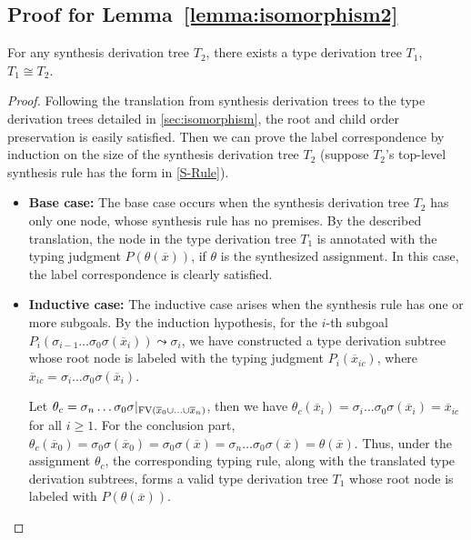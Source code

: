 \subsection{Proof for Lemma~\ref{lemma:isomorphism2}}
\label{sec:appendix-lemma4}

\begin{lemma}
For any synthesis derivation tree $T_2$, there exists a type derivation tree $T_1$, $T_1 \cong T_2$.
\end{lemma}
\begin{proof}
  Following the translation from synthesis derivation trees to the type derivation trees detailed in \autoref{sec:isomorphism}, the root and child order preservation is easily satisfied. Then we can prove the label correspondence by induction on the size of the synthesis derivation tree $T_2$ (suppose $T_2$'s top-level synthesis rule has the form in \autoref{S-Rule}).

  \begin{itemize}
     \item \textbf{Base case:} The base case occurs when the synthesis derivation tree $T_2$ has only one node, whose synthesis rule has no premises. By the described translation, the node in the type derivation tree $T_1$ is annotated with the typing judgment $P(\theta(\overline{x}))$, if $\theta$ is the synthesized assignment. In this case, the label correspondence is clearly satisfied.
     \item \textbf{Inductive case:} The inductive case arises when the synthesis rule has one or more subgoals. 
     By the induction hypothesis, for the $i$-th subgoal $P_i(\sigma_{i-1}\ldots\sigma_0\sigma(\overline{x}_i)) \leadsto \sigma_i$, we have constructed a type derivation subtree whose root node is labeled with the typing judgment $P_i(\overline{x}_{ic})$, where $\overline{x}_{ic}=\sigma_{i}\ldots\sigma_0\sigma(\overline{x}_i)$. 
     
     Let $\theta_c=\sigma_{n}\ldots\sigma_0\sigma|_{\text{FV}(\overline{x}_0\cup\ldots\cup\overline{x}_n)}$, then we have $\theta_c(\overline{x}_{i})=\sigma_{i}\ldots\sigma_0\sigma(\overline{x}_i)=\overline{x}_{ic}$ for all $i\geq 1$. 
     For the conclusion part, $\theta_c(\overline{x}_{0})=\sigma_0\sigma(\overline{x}_0)=\sigma_0\sigma(\overline{x})=\sigma_n \ldots \sigma_0\sigma(\overline{x})=\theta(\overline{x})$. 
     Thus, under the assignment $\theta_c$, the corresponding typing rule, along with the translated type derivation subtrees, forms a valid type derivation tree $T_1$ whose root node is labeled with $P(\theta(\overline{x}))$.
 \end{itemize}
\end{proof}

